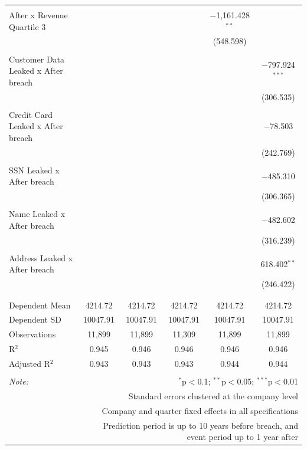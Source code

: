 \documentclass[../Main.tex]{subfiles}
\begin{document}
\begin{table}[!htbp]
{\begin{tabular}{@{\extracolsep{5pt}}lccccc}
  & & & & & \\ 
 After x Revenue Quartile 3 &  &  &  & $-$1,161.428$^{**}$ &  \\ 
  &  &  &  & (548.598) &  \\ 
  & & & & & \\ 
 Customer Data Leaked x After breach &  &  &  &  & $-$797.924$^{***}$ \\ 
  &  &  &  &  & (306.535) \\ 
  & & & & & \\ 
 Credit Card Leaked x After breach &  &  &  &  & $-$78.503 \\ 
  &  &  &  &  & (242.769) \\ 
  & & & & & \\ 
 SSN Leaked x After breach &  &  &  &  & $-$485.310 \\ 
  &  &  &  &  & (306.365) \\ 
  & & & & & \\ 
 Name Leaked x After breach &  &  &  &  & $-$482.602 \\ 
  &  &  &  &  & (316.239) \\ 
  & & & & & \\ 
 Address Leaked x After breach &  &  &  &  & 618.402$^{**}$ \\ 
  &  &  &  &  & (246.422) \\ 
  & & & & & \\ 
\hline \\[-1.8ex] 
Dependent Mean & 4214.72 & 4214.72 & 4214.72 & 4214.72 & 4214.72 \\ 
Dependent SD & 10047.91 & 10047.91 & 10047.91 & 10047.91 & 10047.91 \\ 
Observations & 11,899 & 11,899 & 11,309 & 11,899 & 11,899 \\ 
R$^{2}$ & 0.945 & 0.946 & 0.946 & 0.946 & 0.946 \\ 
Adjusted R$^{2}$ & 0.943 & 0.943 & 0.943 & 0.944 & 0.944 \\ 
\hline 
\hline \\[-1.8ex] 
\textit{Note:}  & \multicolumn{5}{r}{$^{*}$p$<$0.1; $^{**}$p$<$0.05; $^{***}$p$<$0.01} \\ 
 & \multicolumn{5}{r}{Standard errors clustered at the company level} \\ 
 & \multicolumn{5}{r}{Company and quarter fixed effects in all specifications} \\ 
 & \multicolumn{5}{r}{Prediction period is up to 10 years before breach, and event period up to 1 year after} \\ 
\end{tabular}} 
\end{table} 
\end{document}
